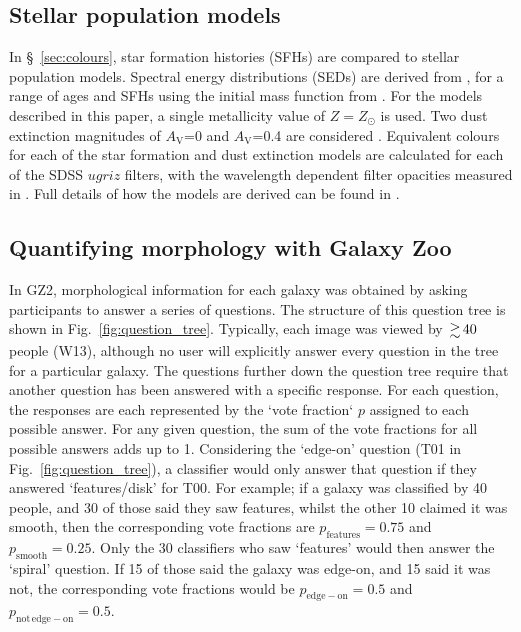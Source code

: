 \documentclass[useAMS,usenatbib]{mn2e}
\begin{document}
\subsection{Stellar population models}
\label{sec:SEDs}

In \S~\ref{sec:colours}, star formation histories (SFHs) are compared to stellar population models. Spectral energy distributions (SEDs) are derived from \citet{BC_03}, for a range of ages and SFHs using the initial mass function from \citet{Chabrier_03}. For the models described in this paper, a single metallicity value of $Z=Z_{\odot}$ is used. Two dust extinction magnitudes of $A_\mathrm{V}$=0 and $A_\mathrm{V}$=0.4 are considered \citep{Calzetti_00}. Equivalent colours for each of the star formation and dust extinction models are calculated for each of the SDSS $ugriz$ filters, with the wavelength dependent filter opacities measured in \citet{Doi_10}. Full details of how the models are derived can be found in \citet{Duncan_14}.
\subsection{Quantifying morphology with Galaxy Zoo}
\label{sec:gz_morphologies}

In GZ2, morphological information for each galaxy was obtained by asking participants to answer a series of questions. The structure of this question tree is shown in Fig.~\ref{fig:question_tree}. Typically, each image was viewed by $\ga 40$ people (W13), although no user will explicitly answer every question in the tree for a particular galaxy. The questions further down the question tree require that another question has been answered with a specific response. For each question, the responses are each represented by the `vote fraction` $p$ assigned to each possible answer. For any given question, the sum of the vote fractions for all possible answers adds up to 1. Considering the `edge-on' question (T01 in Fig.~\ref{fig:question_tree}), a classifier would only answer that question if they answered `features/disk' for T00. For example; if a galaxy was classified by 40 people, and 30 of those said they saw features, whilst the other 10 claimed it was smooth, then the corresponding vote fractions are $p_{\mathrm{features}}=0.75$ and $p_\mathrm{{smooth}}=0.25$. Only the 30 classifiers who saw `features' would then answer the `spiral' question. If 15 of those said the galaxy was edge-on, and 15 said it was not, the corresponding vote fractions would be $p_\mathrm{edge-on}=0.5$ and $p_\mathrm{not \, edge-on}=0.5$. 
\end{document}
